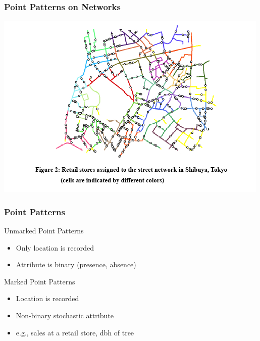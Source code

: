\documentclass[nototal]{beamer}
\begin{document}
\begin{frame}[<+->]
    \frametitle{Point Patterns on Networks}
    \begin{center}
      \includegraphics[width=.95\linewidth]{sanet.jpg}
    \end{center}
  \end{frame}
\begin{frame}[<+->]
  \frametitle{Point Patterns}
  \begin{block}{Unmarked Point Patterns}
    \begin{itemize}
      \item Only location is recorded
      \item Attribute is binary (presence, absence)
    \end{itemize}
   \end{block}
\begin{block}{Marked Point Patterns}
    \begin{itemize}
      \item Location is recorded
      \item Non-binary stochastic attribute
      \item e.g., sales at a retail store, dbh of tree
    \end{itemize}
   \end{block}
 \end{frame}
\end{document}
